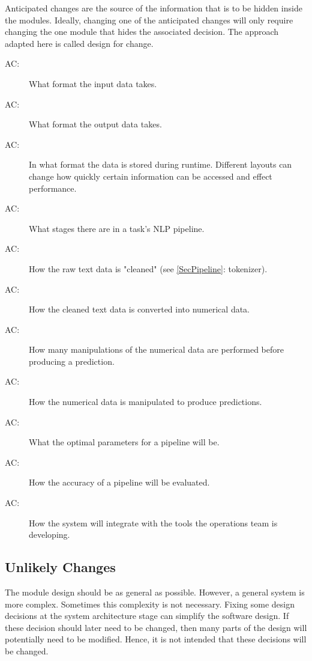 \documentclass[12pt, titlepage]{article}
\newcounter{acnum}
\newcommand{\actheacnum}{AC\theacnum}
\begin{document}
Anticipated changes are the source of the information that is to be hidden
inside the modules. Ideally, changing one of the anticipated changes will only
require changing the one module that hides the associated decision. The approach
adapted here is called design for
change.

\begin{description}
\item[ \actheacnum \label{acInput}:] What format the input data takes.
\item[ \actheacnum \label{acOutput}:] What format the output data takes.
\item[ \actheacnum \label{acData}:] In what format the data is stored during runtime. Different layouts can change how quickly certain information can be accessed and effect performance.
\item[ \actheacnum \label{acPipelineStages}:] What stages there are in a task's NLP pipeline.
\item[ \actheacnum \label{acTokenization}:] How the raw text data is "cleaned" (see \ref{SecPipeline}: tokenizer).
\item[ \actheacnum \label{acRepModel}:] How the cleaned text data is converted into numerical data.
\item[ \actheacnum \label{acPredModel}:] How many manipulations of the numerical data are performed before producing a prediction.
\item[ \actheacnum \label{acTrans}:] How the numerical data is manipulated to produce predictions.
\item[ \actheacnum \label{acParams}:] What the optimal parameters for a pipeline will be.
\item[ \actheacnum \label{acMets}:] How the accuracy of a pipeline will be evaluated.
\item[ \actheacnum \label{acOps}:] How the system will integrate with the tools the operations team is developing.
\end{description}

\subsection{Unlikely Changes} \label{SecUchange}

The module design should be as general as possible. However, a general system is
more complex. Sometimes this complexity is not necessary. Fixing some design
decisions at the system architecture stage can simplify the software design. If
these decision should later need to be changed, then many parts of the design
will potentially need to be modified. Hence, it is not intended that these
decisions will be changed.
\end{document}
